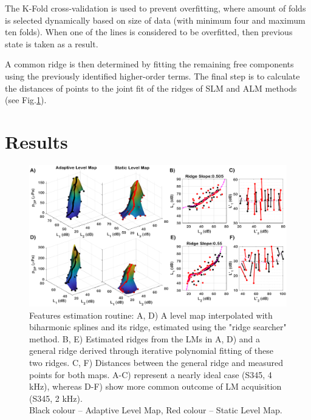 \documentclass[journal,twoside,web]{ieeecolor2}
\begin{document}
The K-Fold cross-validation is used to prevent overfitting, where amount of folds is selected dynamically based on size of data (with minimum four and maximum ten folds).
When one of the lines is considered to be overfitted, then previous state is taken as a result.

A common ridge is then determined by fitting the remaining free components using the previously identified higher-order terms.
The final step is to calculate the distances of points to the joint fit of the ridges of SLM and ALM methods (see Fig.\ref{fig_BLK}).

\section{Results}

\begin{figure}
\includegraphics[width=\textwidth]{Fig_5_assembly2.eps} %
\caption{Features estimation routine: A, D) A level map interpolated with biharmonic splines and its ridge, estimated using the "ridge searcher" method.
B, E) Estimated ridges from the LMs in A, D) and a general ridge derived through iterative polynomial fitting of these two ridges.
C, F) Distances between the general ridge and measured points for both maps.
A-C) represent a nearly ideal case (S345, 4 kHz), whereas D-F) show more common outcome of LM acquisition (S345, 2 kHz).\\ Black colour – Adaptive Level Map, Red colour – Static Level Map.}
\label{fig_BLK}
\end{figure}
\end{document}
